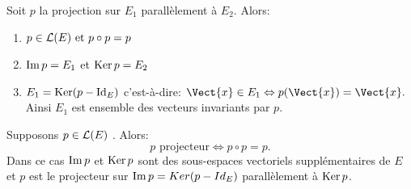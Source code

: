 \documentclass{book}
\begin{document}
\begin{Proposition}[Propriétés] Soit $p$ la projection sur $E_1$ parallèlement à $E_2$. Alors:
\begin{enumerate}
\item $p \in   \mathcal{L}(E)\text{ et }p \circ p = p$
\item $\operatorname{Im} p = E_1$ et $\operatorname{Ker} p = E_2$
\item $E_1 = \operatorname{Ker}(p - \mathrm{Id}_E)$ c'est-à-dire: $\Vect{ x }\in   E_1 \Leftrightarrow p(\Vect{x}) = \Vect{x}.$ Ainsi $E_1$ est ensemble des vecteurs invariants par $p$.
\end{enumerate}
\end{Proposition}
\begin{Proposition}[Caractérisation] Supposons $p \in   \mathcal{L}(E)$ . Alors:
$$p\text{ projecteur} \Leftrightarrow p \circ p = p.$$
Dans ce cas $\operatorname{Im} p$ et $\operatorname{Ker} p$ sont des sous-espaces vectoriels supplémentaires de $E$ et $p$ est le projecteur sur $\operatorname{Im} p =
Ker(p - Id_E)$ parallèlement à $\operatorname{Ker} p$.
\end{Proposition}
%
%
%
%
\end{document}
